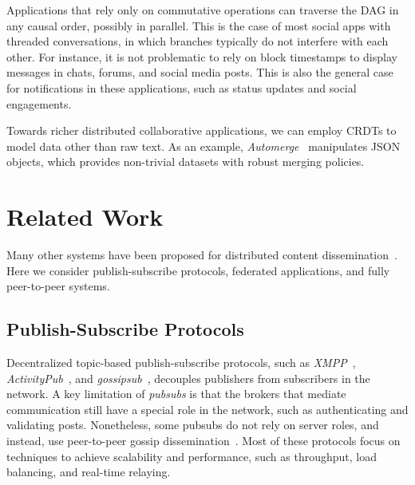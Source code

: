 \documentclass[10pt,journal,compsoc]{IEEEtran}
\begin{document}
Applications that rely only on commutative operations can traverse the DAG in
any causal order, possibly in parallel.
This is the case of most social apps with threaded conversations, in which
branches typically do not interfere with each other.
For instance, it is not problematic to rely on block timestamps to display
messages in chats, forums, and social media posts.
This is also the general case for notifications in these applications, such as
status updates and social engagements.

Towards richer distributed collaborative applications, we can employ CRDTs to
model data other than raw text.
As an example, \emph{Automerge}~\cite{p2p.automerge} manipulates JSON objects,
which provides non-trivial datasets with robust merging policies.

\section{Related Work}
\label{sec.related}


Many other systems have been proposed for distributed content
dissemination~\cite{p2p.survey,p2p.ecosystem}.
Here we consider publish-subscribe protocols, federated applications, and fully
peer-to-peer systems.

\subsection{Publish-Subscribe Protocols}

Decentralized topic-based publish-subscribe protocols, such as
    \emph{XMPP}~\cite{pubsub.xmpp},
    \emph{ActivityPub}~\cite{pubsub.activitypub}, and
    \emph{gossipsub}~\cite{pubsub.gossipsub},
decouples publishers from subscribers in the network.
%
A key limitation of \emph{pubsubs} is that the brokers that mediate
communication still have a special role in the network, such as authenticating
and validating posts.
%
Nonetheless, some pubsubs do not rely on server roles, and instead, use
peer-to-peer gossip dissemination~\cite{pubsub.tera,pubsub.rappel,pubsub.stan,pubsub.vitis,pubsub.gossipsub,pubsub.rappel}.
Most of these protocols focus on techniques to achieve scalability and
performance, such as throughput, load balancing, and real-time relaying.
\end{document}
